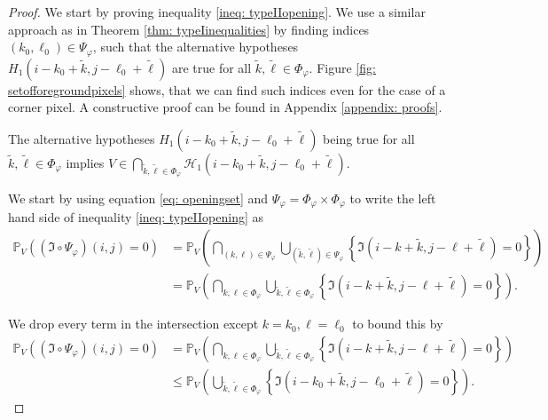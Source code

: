\documentclass[a4paper,12pt]{article}
\theoremstyle{plain}
\theoremstyle{definition}
\begin{document}
\begin{proof}
	We start by proving inequality \eqref{ineq: typeIIopening}. We use a similar approach as in Theorem \ref{thm: typeIinequalities} by finding indices $(k_0, \ell_0) \in \Psi_\varphi$, such that the alternative hypotheses $H_1(i - k_0 + \tilde{k}, j - \ell_0 + \tilde{\ell})$ are true for all $\tilde{k}, \tilde{\ell} \in \Phi_\varphi$. Figure \ref{fig: setofforegroundpixels} shows, that we can find such indices even for the case of a corner pixel. A constructive proof can be found in Appendix \ref{appendix: proofs}.
	
	
	
	The alternative hypotheses $H_1(i - k_0 + \tilde{k}, j - \ell_0 + \tilde{\ell})$ being true for all $\tilde{k}, \tilde{\ell} \in \Phi_\varphi$ implies $V \in \bigcap_{\tilde{k}, \tilde{\ell} \in \Phi_\varphi} \mathcal{H}_1(i - k_0 + \tilde{k}, j - \ell_0 + \tilde{\ell})$.
	
	We start by using equation \eqref{eq: openingset} and $\Psi_\varphi = \Phi_\varphi \times \Phi_\varphi$ to write the left hand side of inequality \eqref{ineq: typeIIopening} as
	\begin{align*}
		\mathbb{P}_V\left( (\mathfrak{I} \circ \Psi_\varphi)(i, j) = 0 \right) &= \mathbb{P}_V\left( \bigcap_{(k, \ell) \in \Psi_\varphi} \bigcup_{(\tilde{k}, \tilde{\ell}) \in \Psi_\varphi} \left\{ \mathfrak{I}(i - k + \tilde{k}, j - \ell + \tilde{\ell}) = 0 \right\} \right) \\
		&= \mathbb{P}_V\left( \bigcap_{k, \ell \in \Phi_\varphi} \bigcup_{\tilde{k}, \tilde{\ell} \in \Phi_\varphi} \left\{ \mathfrak{I}(i - k + \tilde{k}, j - \ell + \tilde{\ell}) = 0 \right\} \right).
	\end{align*}
	
	We drop every term in the intersection except $k = k_0, \ell = \ell_0$ to bound this by
	\begin{align*}
		\mathbb{P}_V\left( (\mathfrak{I} \circ \Psi_\varphi)(i, j) = 0 \right) &= \mathbb{P}_V\left( \bigcap_{k, \ell \in \Phi_\varphi} \bigcup_{\tilde{k}, \tilde{\ell} \in \Phi_\varphi} \left\{ \mathfrak{I}(i - k + \tilde{k}, j - \ell + \tilde{\ell}) = 0 \right\} \right) \\
		&\leq \mathbb{P}_V\left( \bigcup_{\tilde{k}, \tilde{\ell} \in \Phi_\varphi} \left\{ \mathfrak{I}(i - k_0 + \tilde{k}, j - \ell_0 + \tilde{\ell}) = 0 \right\} \right).
	\end{align*}
	

\end{proof}
\end{document}

